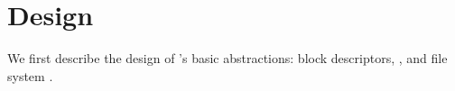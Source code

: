\section{Design}
\label{sec:design}

We first describe the design of \Kudos's basic abstractions: block
descriptors, \chdescs, and file system \modules.



